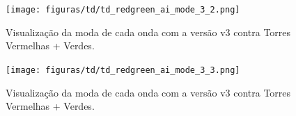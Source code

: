 \begin{figure}[H]
  \centering
  \texttt{[image: figuras/td/td\_redgreen\_ai\_mode\_3\_2.png]}
  \caption{Visualização da moda de cada onda com a versão v3 contra Torres Vermelhas + Verdes.}
  \label{fig:td-moda-redgreen-3-2}
\end{figure}

\begin{figure}[H]
  \centering
  \texttt{[image: figuras/td/td\_redgreen\_ai\_mode\_3\_3.png]}
  \caption{Visualização da moda de cada onda com a versão v3 contra Torres Vermelhas + Verdes.}
  \label{fig:td-moda-redgreen-3-3}
\end{figure}